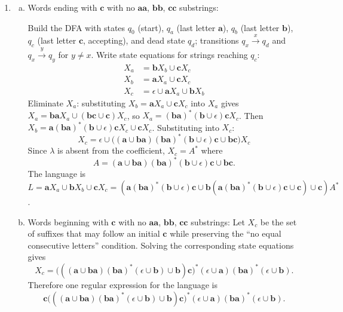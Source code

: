 \begin{enumerate}[{6.}1.]
Since $(\pmb{10})^*$ contains $\lambda$, Theorem~6.1 does not guarantee a
unique solution here.  Following the chapter's discussion of ambiguous
equations, the least solution is
\[
  X_0=((\pmb{10})^*\cup C)^*(\pmb{0}^*\pmb{1}\cup\pmb{0}(\pmb{0}\cup\pmb{1})\pmb{0}^*).
\]
Back-substitution then gives
\[
  X_1=
  \pmb{0}^*\cup
  \pmb{0}^*\pmb{1}^*\pmb{01}
  ((\pmb{10})^*\cup C)^*(\pmb{0}^*\pmb{1}\cup\pmb{0}(\pmb{0}\cup\pmb{1})\pmb{0}^*).
\]

\item \begin{enumerate}[(a)]
  \item Words ending with $\pmb{c}$ with no $\pmb{aa}$, $\pmb{bb}$, $\pmb{cc}$ substrings:

  Build the DFA with states $q_0$ (start), $q_a$ (last letter $\pmb{a}$), $q_b$ (last letter $\pmb{b}$), $q_c$ (last letter $\pmb{c}$, accepting), and dead state $q_d$; transitions $q_x\xrightarrow{x}q_d$ and $q_x\xrightarrow{y}q_y$ for $y\neq x$.  Write state equations for strings reaching $q_c$:
  \begin{align*}
    X_a &= \pmb{b} X_b \cup \pmb{c} X_c \\
    X_b &= \pmb{a} X_a \cup \pmb{c} X_c \\
    X_c &= \epsilon \cup \pmb{a} X_a \cup \pmb{b} X_b
  \end{align*}
  Eliminate $X_a$: substituting $X_b = \pmb{a}X_a\cup\pmb{c}X_c$ into $X_a$ gives $X_a = \pmb{ba}X_a\cup(\pmb{bc}\cup\pmb{c})X_c$, so $X_a=(\pmb{ba})^*(\pmb{b}\cup\epsilon)\pmb{c} X_c$.  Then $X_b = \pmb{a}(\pmb{ba})^*(\pmb{b}\cup\epsilon)\pmb{c} X_c\cup\pmb{c} X_c$.  Substituting into $X_c$:
  \[
    X_c = \epsilon \cup \bigl((\pmb{a}\cup\pmb{ba})(\pmb{ba})^*(\pmb{b}\cup\epsilon)\pmb{c}\cup\pmb{bc}\bigr)X_c
  \]
  Since $\lambda$ is absent from the coefficient, $X_c = A^*$ where
  \[
    A = (\pmb{a}\cup\pmb{ba})(\pmb{ba})^*(\pmb{b}\cup\epsilon)\pmb{c}\cup\pmb{bc}.
  \]
  The language is $L = \pmb{a} X_a\cup\pmb{b} X_b\cup\pmb{c} X_c = (\pmb{a}(\pmb{ba})^*(\pmb{b}\cup\epsilon)\pmb{c} \cup \pmb{b}(\pmb{a}(\pmb{ba})^*(\pmb{b}\cup\epsilon)\pmb{c}\cup\pmb{c})\cup\pmb{c}) A^*$.

  \item Words beginning with $\pmb{c}$ with no $\pmb{aa}$, $\pmb{bb}$, $\pmb{cc}$ substrings:
  Let $X_c$ be the set of suffixes that may follow an initial $\pmb{c}$ while
  preserving the ``no equal consecutive letters'' condition.  Solving the
  corresponding state equations gives
  \[
    X_c=
    \bigl(((\pmb{a}\cup\pmb{ba})(\pmb{ba})^*(\epsilon\cup\pmb{b})\cup\pmb{b})\pmb{c}\bigr)^*
    (\epsilon\cup\pmb{a})(\pmb{ba})^*(\epsilon\cup\pmb{b}).
  \]
  Therefore one regular expression for the language is
  \[
    \pmb{c}\bigl(((\pmb{a}\cup\pmb{ba})(\pmb{ba})^*(\epsilon\cup\pmb{b})\cup\pmb{b})\pmb{c}\bigr)^*
    (\epsilon\cup\pmb{a})(\pmb{ba})^*(\epsilon\cup\pmb{b}).
  \]
\end{enumerate}


\end{enumerate}
